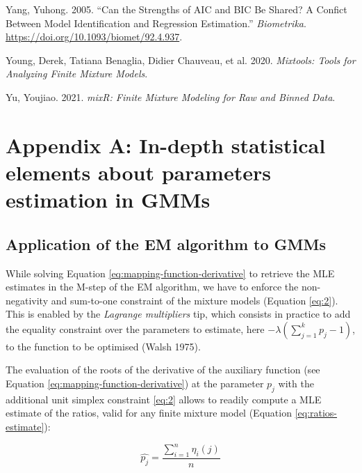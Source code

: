 \begin{CSLReferences}{1}{0}
\leavevmode{}%
Yang, Yuhong. 2005. {``Can the Strengths of {AIC} and {BIC} Be Shared? {A} Confict Between Model Identification and Regression Estimation.''} \emph{Biometrika}. \url{https://doi.org/10.1093/biomet/92.4.937}.

\leavevmode{}%
Young, Derek, Tatiana Benaglia, Didier Chauveau, et al. 2020. \emph{Mixtools: Tools for Analyzing Finite Mixture Models}.

\leavevmode{}%
Yu, Youjiao. 2021. \emph{mixR: Finite Mixture Modeling for Raw and Binned Data}.

\end{CSLReferences}

\appendix

\hypertarget{appendix-a-in-depth-statistical-elements-about-parameters-estimation-in-gmms}{%
\section{Appendix A: In-depth statistical elements about parameters estimation in GMMs}\label{appendix-a-in-depth-statistical-elements-about-parameters-estimation-in-gmms}}

\hypertarget{application-of-the-em-algorithm-to-gmms}{%
\subsection{Application of the EM algorithm to GMMs}\label{application-of-the-em-algorithm-to-gmms}}

While solving Equation \eqref{eq:mapping-function-derivative} to retrieve the MLE estimates in the M-step of the EM algorithm, we have to enforce the non-negativity and sum-to-one constraint of the mixture models (Equation
\eqref{eq:2}). This is enabled by the \emph{Lagrange multipliers} tip, which consists in practice to add the equality constraint over the parameters to estimate, here \(-\lambda (\sum_{j=1}^k p_j -1)\), to the function to be optimised (Walsh 1975).

The evaluation of the roots of the derivative of the auxiliary function
(see Equation \eqref{eq:mapping-function-derivative}) at the parameter \(p_j\) with the additional unit simplex constraint \eqref{eq:2} allows to readily compute a MLE estimate of the ratios, valid for any finite mixture model (Equation \eqref{eq:ratios-estimate}):

\begin{equation}
\hat{p_j}= \frac{\sum_{i=1}^n \eta_{i}(j)}{n}
\label{eq:ratios-estimate}
\end{equation}

